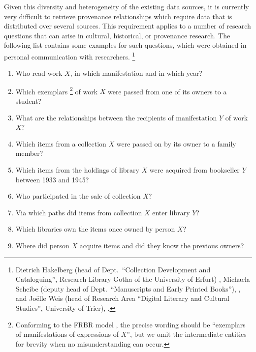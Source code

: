 Given this diversity and heterogeneity of the existing data sources,
it is currently very difficult to retrieve provenance relationships
which require data that is distributed over several sources.
This requirement applies to a number of research questions
that can arise in cultural, historical, or provenance research.
The following list contains some examples for such questions,
which were obtained in personal communication with researchers.%
\footnote{%
  \foreignlanguage{ngerman}{Dietrich Hakelberg}
  (head of Dept.\ \enquote{Collection Development and Cataloguing}, Research Library \foreignlanguage{ngerman}{Gotha} of the University of \foreignlanguage{ngerman}{Erfurt})
  \autocite{HakelbergWeb},
  \foreignlanguage{ngerman}{Michaela Scheibe}
  (deputy head of Dept.\ \enquote{Manuscripts and Early Printed Books}),
  \autocite{ScheibeWeb},
  and \foreignlanguage{ngerman}{Jo\"elle Weis} 
  (head of Research Area \enquote{Digital Literary and Cultural Studies}, University of \foreignlanguage{ngerman}{Trier}), 
  \autocite{WeisWeb}.
}
%
\begin{enumerate}
  \item[\exaquery{1}]
    Who read %
    work $X$, in which manifestation and in which year?
  \item[\exaquery{2}]
    Which exemplars%
    \footnote{%
      Conforming to the FRBR model \autocite{FRBR1998},
      the precise wording should be \enquote{exemplars of manifestations of expressions of $X$},
      but
      we omit the intermediate entities for brevity when no misunderstanding can occur.%
    }
    of work $X$
    were passed from one of its owners to a student?
  \item[\exaquery{3}]
    What are the relationships between the recipients of manifestation $Y$ of work $X$?
  \item[\exaquery{4}]
    Which items from a collection $X$ were passed on by its owner to a family member?
  \item[\exaquery{5}]
    Which items from the holdings of library $X$ were acquired from bookseller $Y$
    between 1933 and 1945?
  \item[\exaquery{6}]
    Who participated in the sale of collection $X$?
  \item[\exaquery{7}]
    Via which paths did items from collection $X$ enter library $Y$?
  \item[\exaquery{8}]
    Which libraries own the items once owned by person $X$?
  \item[\exaquery{9}]
    Where did person $X$ acquire items and did they know the previous owners?
\end{enumerate}
